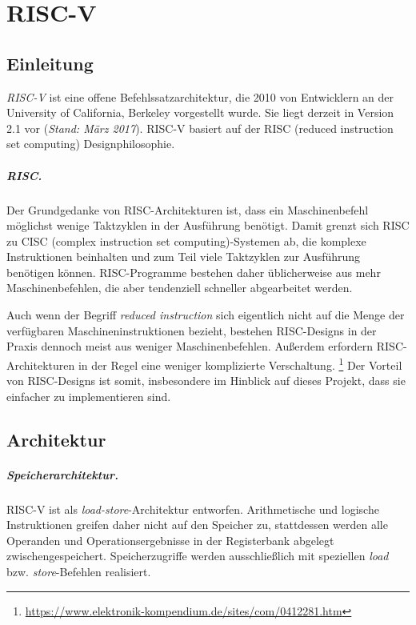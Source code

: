 \chapter{RISC-V} %
\label{RISC-V} %

\section{Einleitung}
\emph{RISC-V} ist eine offene Befehlssatzarchitektur, die 2010 von
Entwicklern an der University of California, Berkeley vorgestellt wurde.
Sie liegt derzeit in Version 2.1 vor (\textit{Stand: März 2017}). RISC-V
basiert auf der RISC (reduced instruction set computing) Designphilosophie.

\paragraph{RISC.} Der Grundgedanke von RISC-Architekturen ist, dass ein Maschinenbefehl möglichst wenige Taktzyklen in der Ausführung benötigt. Damit grenzt sich RISC zu CISC (complex instruction set computing)-Systemen ab, die komplexe Instruktionen beinhalten und zum Teil viele Taktzyklen zur Ausführung benötigen können. RISC-Programme bestehen daher üblicherweise aus mehr Maschinenbefehlen, die aber tendenziell schneller abgearbeitet werden.

Auch wenn der Begriff \textit{reduced instruction} sich
eigentlich nicht auf die Menge der verfügbaren Maschineninstruktionen
bezieht, bestehen RISC-Designs in der Praxis dennoch meist aus weniger
Maschinenbefehlen. Außerdem erfordern RISC-Architekturen in der Regel eine weniger komplizierte Verschaltung. \footnote{\url{https://www.elektronik-kompendium.de/sites/com/0412281.htm}} Der Vorteil von RISC-Designs ist somit, insbesondere im Hinblick auf dieses Projekt, dass sie einfacher zu implementieren sind.

\section{Architektur}
\label{subsec:Register}

\paragraph{Speicherarchitektur.} RISC-V ist als
\textit{load-store}-Architektur entworfen. Arithmetische und logische
Instruktionen greifen daher nicht auf den Speicher zu, stattdessen
werden alle Operanden und Operationsergebnisse in der Registerbank
abgelegt zwischengespeichert.
Speicherzugriffe werden ausschließlich mit speziellen \textit{load} bzw. \textit{store}-Befehlen realisiert.

